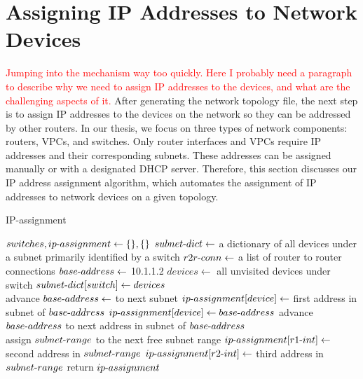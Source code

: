 \documentclass{uiucthesis2021}
\begin{document}
\label{s33}
\section{Assigning IP Addresses to Network Devices}
\noindent \textcolor{red}{Jumping into the mechanism way too quickly. Here I probably need a paragraph to describe why we need to assign IP addresses to the devices, and what are the challenging aspects of it.} After generating the network topology file, the next step is to assign IP addresses to the devices on the network so they can be addressed by other routers. In our thesis, we focus on three types of network components: routers, VPCs, and switches. Only router interfaces and VPCs require IP addresses and their corresponding subnets. These addresses can be assigned manually or with a designated DHCP server. Therefore, this section discusses our IP address assignment algorithm, which automates the assignment of IP addresses to network devices on a given topology. \\

\begin{algorithm}
\caption{IP-assignment}\label{alg:cap}
\begin{algorithmic}
\State $switches, ip{\text -}assignment \gets \{\}, \{\}$
\State $subnet{\text -}dict \gets$ a dictionary of all devices under a subnet primarily identified by a switch
\State $r2r{\text -}conn \gets $ a list of router to router connections
\State $base{\text -}address \gets $ 10.1.1.2
    \State $devices \gets $ all unvisited devices under switch
    \State $subnet{\text -}dict[switch] \gets devices$
\EndFor
\\
    \State advance $base{\text -}address \gets$ to next subnet
            \State $ip{\text -}assignment[device] \gets $ first address in
                               subnet of $base{\text -}address$
        \Else
            \State $ip{\text -}assignment[device] \gets base{\text -}address$
        \EndIf
        \State advance $base{\text -}address $ to next address in subnet of $base{\text -}address$
    \EndFor
\EndFor
\\
    \State assign $subnet{\text -}range$ to the next free subnet range
        \State $ip{\text -}assignment[r1{\text -}int] \gets $ second address in $subnet{\text -}range$
        \State $ip{\text -}assignment[r2{\text -}int] \gets $ third address in $subnet{\text -}range$
    \EndIf
\EndFor
\State return $ip{\text -}assignment$
\end{algorithmic}
\end{algorithm} 
\end{document}
